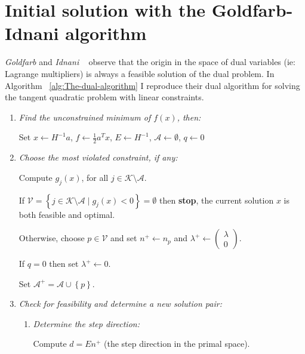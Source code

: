 \documentclass[a4paper,twoside,10pt,english]{report}
\begin{document}
\section{\label{sub:Initial-estimate-with-Goldfarb-Idnani}Initial solution with the Goldfarb-Idnani algorithm}
\emph{Goldfarb} and \emph{Idnani}
~\cite{GoldfarbIdnani_NumericallyStableDualQuadraticPrograms}
observe that the origin in the space of dual variables (ie: Lagrange
multipliers) is always a feasible solution of the dual problem. In Algorithm
~\ref{alg:The-dual-algorithm} I reproduce their dual algorithm for solving 
the tangent quadratic problem with linear constraints.
\begin{algorithm}[!htb]
\begin{enumerate}[start=0]
  \item \emph{Find the unconstrained minimum of $f\left(x\right)$, then:}

  Set $x\leftarrow H^{-1}a$, $f\leftarrow\frac{1}{2}a^{T}x$, $E\leftarrow H^{-1}$,
  $\mathcal{A}\leftarrow\emptyset$, $q\leftarrow0$

  \item \label{itm:Choose-constraint}\emph{Choose the most violated constraint,
      if any:}

  Compute $g_{j}\left(x\right)$, for all $j\in\mathcal{K}\setminus\mathcal{A}$.

  If $\mathcal{V}=\left\{ j\in\mathcal{K}\setminus
  \mathcal{A}\mid g_{j}\left(x\right)<0\right\} =\emptyset$ then \textbf{stop},
  the current solution $x$ is both feasible and optimal.

  Otherwise, choose $p\in\mathcal{V}$ and set $n^{+}\leftarrow n_{p}$ and 
  $\lambda^{+}\leftarrow\left(\begin{array}{c}
   \lambda\\
   0
   \end{array}\right)$. 

  If $q=0$ then set $\lambda^{+}\leftarrow0$. 

  Set $\mathcal{A}^{+}=\mathcal{A}\cup\left\{ p\right\}$.

  \item \emph{Check for feasibility and determine a new solution pair:}

  \begin{enumerate}
    \item \label{itm:Determine-step-direction} \emph{Determine the step 
        direction:}

    Compute $d=En^{+}$ (the step direction in the primal space).


\end{enumerate}
\end{enumerate}
\end{algorithm}
\end{document}
